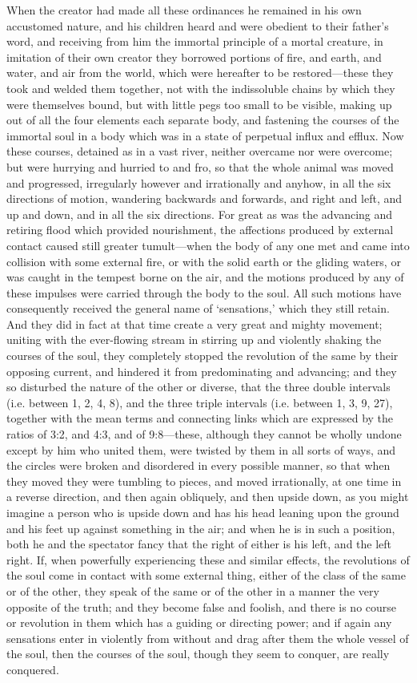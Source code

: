 When the creator had made all these ordinances he remained in his own
accustomed nature, and his children heard and were obedient to their
father’s word, and receiving from him the immortal principle of a mortal
creature, in imitation of their own creator they borrowed portions of
fire, and earth, and water, and air from the world, which were hereafter
to be restored—these they took and welded them together, not with
the indissoluble chains by which they were themselves bound, but with
little pegs too small to be visible, making up out of all the four
elements each separate body, and fastening the courses of the immortal
soul in a body which was in a state of perpetual influx and efflux. Now
these courses, detained as in a vast river, neither overcame nor were
overcome; but were hurrying and hurried to and fro, so that the whole
animal was moved and progressed, irregularly however and irrationally and
anyhow, in all the six directions of motion, wandering backwards and
forwards, and right and left, and up and down, and in all the six
directions. For great as was the advancing and retiring flood which
provided nourishment, the affections produced by external contact caused
still greater tumult—when the body of any one met and came into
collision with some external fire, or with the solid earth or the gliding
waters, or was caught in the tempest borne on the air, and the motions
produced by any of these impulses were carried through the body to the
soul. All such motions have consequently received the general name of
‘sensations,’ which they still retain. And they did in fact at that time
create a very great and mighty movement; uniting with the ever-flowing
stream in stirring up and violently shaking the courses of the soul, they
completely stopped the revolution of the same by their opposing current,
and hindered it from predominating and advancing; and they so disturbed
the nature of the other or diverse, that the three double intervals (i.e.
between 1, 2, 4, 8), and the three triple intervals (i.e. between 1, 3, 9,
27), together with the mean terms and connecting links which are expressed
by the ratios of 3:2, and 4:3, and of 9:8—these, although they
cannot be wholly undone except by him who united them, were twisted by
them in all sorts of ways, and the circles were broken and disordered in
every possible manner, so that when they moved they were tumbling to
pieces, and moved irrationally, at one time in a reverse direction, and
then again obliquely, and then upside down, as you might imagine a person
who is upside down and has his head leaning upon the ground and his feet
up against something in the air; and when he is in such a position, both
he and the spectator fancy that the right of either is his left, and the
left right. If, when powerfully experiencing these and similar effects,
the revolutions of the soul come in contact with some external thing,
either of the class of the same or of the other, they speak of the same or
of the other in a manner the very opposite of the truth; and they become
false and foolish, and there is no course or revolution in them which has
a guiding or directing power; and if again any sensations enter in
violently from without and drag after them the whole vessel of the soul,
then the courses of the soul, though they seem to conquer, are really
conquered.

